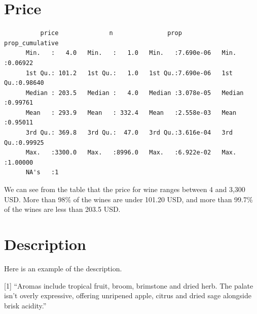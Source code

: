 \documentclass[12pt,twoside]{amherstthesis}
\newenvironment{Shaded}{\begin{snugshade}}{\end{snugshade}}
\newcommand{\KeywordTok}[1]{\textcolor[rgb]{0.13,0.29,0.53}{\textbf{#1}}}
\newcommand{\DataTypeTok}[1]{\textcolor[rgb]{0.13,0.29,0.53}{#1}}
\newcommand{\DecValTok}[1]{\textcolor[rgb]{0.00,0.00,0.81}{#1}}
\newcommand{\StringTok}[1]{\textcolor[rgb]{0.31,0.60,0.02}{#1}}
\newcommand{\OtherTok}[1]{\textcolor[rgb]{0.56,0.35,0.01}{#1}}
\newcommand{\OperatorTok}[1]{\textcolor[rgb]{0.81,0.36,0.00}{\textbf{#1}}}
\newcommand{\NormalTok}[1]{#1}
\begin{document}
\section{Price}\label{price}
\begin{Shaded}
\end{Shaded}
\begin{verbatim}
          price              n               prop           prop_cumulative  
      Min.   :   4.0   Min.   :   1.0   Min.   :7.690e-06   Min.   :0.06922  
      1st Qu.: 101.2   1st Qu.:   1.0   1st Qu.:7.690e-06   1st Qu.:0.98640  
      Median : 203.5   Median :   4.0   Median :3.078e-05   Median :0.99761  
      Mean   : 293.9   Mean   : 332.4   Mean   :2.558e-03   Mean   :0.95011  
      3rd Qu.: 369.8   3rd Qu.:  47.0   3rd Qu.:3.616e-04   3rd Qu.:0.99925  
      Max.   :3300.0   Max.   :8996.0   Max.   :6.922e-02   Max.   :1.00000  
      NA's   :1
\end{verbatim}
We can see from the table that the price for wine ranges between 4 and
3,300 USD. More than 98\% of the wines are under 101.20 USD, and more
than 99.7\% of the wines are less than 203.5 USD.

\section{Description}\label{description}

Here is an example of the description.
\begin{Shaded}
\end{Shaded}
{[}1{]} ``Aromas include tropical fruit, broom, brimstone and dried
herb. The palate isn't overly expressive, offering unripened apple,
citrus and dried sage alongside brisk acidity.''
\end{document}
